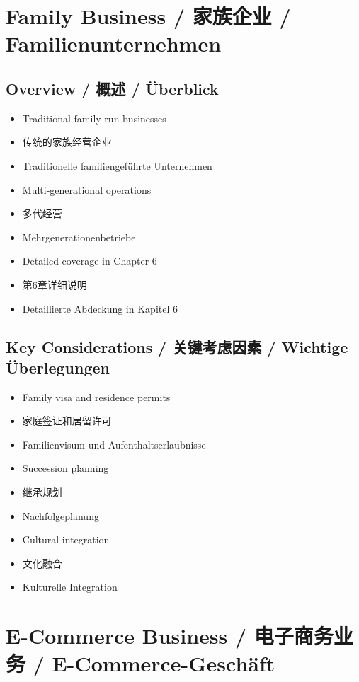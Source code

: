 \section{Family Business / 家族企业 / Familienunternehmen}

\subsection{Overview / 概述 / Überblick}
\begin{itemize}
    \item Traditional family-run businesses
    \item 传统的家族经营企业
    \item Traditionelle familiengeführte Unternehmen
    \item Multi-generational operations
    \item 多代经营
    \item Mehrgenerationenbetriebe
    \item Detailed coverage in Chapter 6
    \item 第6章详细说明
    \item Detaillierte Abdeckung in Kapitel 6
\end{itemize}

\subsection{Key Considerations / 关键考虑因素 / Wichtige Überlegungen}
\begin{itemize}
    \item Family visa and residence permits
    \item 家庭签证和居留许可
    \item Familienvisum und Aufenthaltserlaubnisse
    \item Succession planning
    \item 继承规划
    \item Nachfolgeplanung
    \item Cultural integration
    \item 文化融合
    \item Kulturelle Integration
\end{itemize}

\section{E-Commerce Business / 电子商务业务 / E-Commerce-Geschäft}

